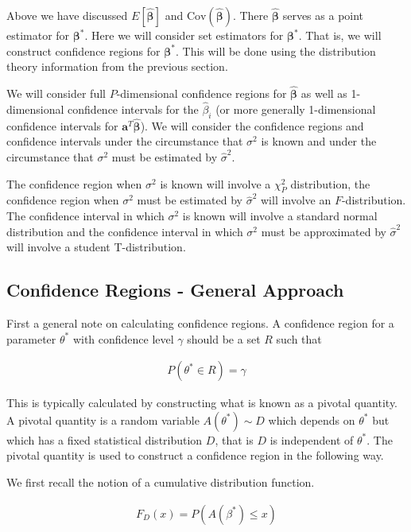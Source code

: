 \documentclass[12pt]{article}
\newcommand{\bv}[1]{\boldsymbol{#1}}
\begin{document}
Above we have discussed $E[\bv{\hat{\beta}}]$ and $\text{Cov}(\bv{\hat{\beta}})$. 
There $\bv{\hat{\beta}}$ serves as a point estimator for $\bv{\beta^*}$.
Here we will consider set estimators for $\bv{\beta^*}$.
That is, we will construct confidence regions for $\bv{\beta^*}$.
This will be done using the distribution theory information from the previous section.

We will consider full $P$-dimensional confidence regions for $\bv{\hat{\beta}}$ as well as 1-dimensional confidence intervals for the $\hat{\beta}_i$ (or more generally 1-dimensional confidence intervals for $\bv{a}^T \bv{\hat{\beta}}$).
We will consider the confidence regions and confidence intervals under the circumstance that $\sigma^2$ is known and under the circumstance that $\sigma^2$ must be estimated by $\hat{\sigma}^2$.

The confidence region when $\sigma^2$ is known will involve a $\chi^2_P$ distribution, the confidence region when $\sigma^2$ must be estimated by $\hat{\sigma}^2$ will involve an $F$-distribution.
The confidence interval in which $\sigma^2$ is known will involve a standard normal distribution and the confidence interval in which $\sigma^2$ must be approximated by $\hat{\sigma}^2$ will involve a student T-distribution.

\subsection{Confidence Regions - General Approach}
First a general note on calculating confidence regions.
A confidence region for a parameter $\theta^*$ with confidence level $\gamma$ should be a set $R$ such that

\begin{align}
P(\theta^* \in R) = \gamma
\end{align}

This is typically calculated by constructing what is known as a pivotal quantity.
A pivotal quantity is a random variable $A(\theta^*) \sim D$ which depends on $\theta^*$ but which has a fixed statistical distribution $D$, that is $D$ is independent of $\theta^*$.
The pivotal quantity is used to construct a confidence region in the following way.

We first recall the notion of a cumulative distribution function.

\begin{align}
F_D(x) = P(A(\beta^*) \le x)
\end{align}
\end{document}
